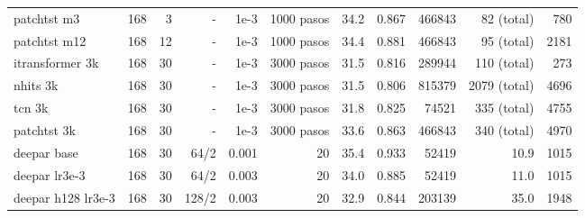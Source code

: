 \begin{tabular}{@{}lrrrrrrrrrr@{}}
patchtst m3 & 168 & 3 & - & 1e-3 & 1000 pasos & 34.2 & 0.867 & 466843 & 82 (total) & 780 \\
patchtst m12 & 168 & 12 & - & 1e-3 & 1000 pasos & 34.4 & 0.881 & 466843 & 95 (total) & 2181 \\
itransformer 3k & 168 & 30 & - & 1e-3 & 3000 pasos & 31.5 & 0.816 & 289944 & 110 (total) & 273 \\
nhits 3k & 168 & 30 & - & 1e-3 & 3000 pasos & 31.5 & 0.806 & 815379 & 2079 (total) & 4696 \\
tcn 3k & 168 & 30 & - & 1e-3 & 3000 pasos & 31.8 & 0.825 & 74521 & 335 (total) & 4755 \\
patchtst 3k & 168 & 30 & - & 1e-3 & 3000 pasos & 33.6 & 0.863 & 466843 & 340 (total) & 4970 \\
deepar base & 168 & 30 & 64/2 & 0.001 & 20 & 35.4 & 0.933 & 52419 & 10.9 & 1015 \\
deepar lr3e-3 & 168 & 30 & 64/2 & 0.003 & 20 & 34.0 & 0.885 & 52419 & 11.0 & 1015 \\
deepar h128 lr3e-3 & 168 & 30 & 128/2 & 0.003 & 20 & 32.9 & 0.844 & 203139 & 35.0 & 1948 \\
\bottomrule
\end{tabular}